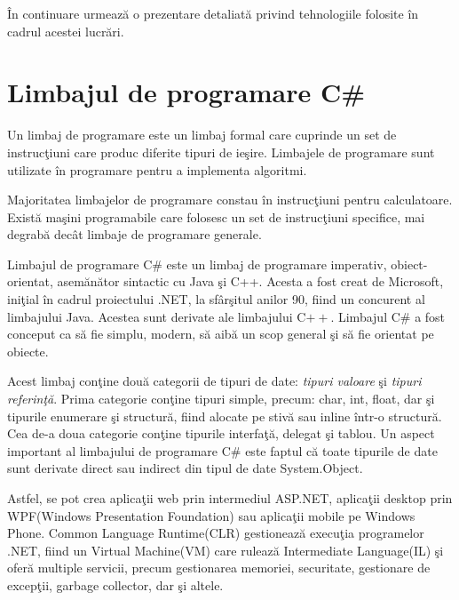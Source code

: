 \^{I}n continuare urmeaz\u{a} o prezentare detaliat\u{a} privind tehnologiile folosite \^{i}n cadrul acestei lucr\u{a}ri.

\section{Limbajul de programare C{\#}}

	Un limbaj de programare este un limbaj formal care cuprinde un set de instruc\c{t}iuni care produc diferite tipuri de ie\c{s}ire. Limbajele de programare sunt utilizate în programare pentru a implementa algoritmi.
	\bigskip
	
	Majoritatea limbajelor de programare constau \^{i}n instruc\c{t}iuni pentru calculatoare. Exist\u{a} ma\c{s}ini programabile care folosesc un set de instruc\c{t}iuni specifice, mai degrab\u{a} dec\^{a}t limbaje de programare generale.
	\bigskip
	
	Limbajul de programare C{\#} este un limbaj de programare imperativ, obiect-orientat, asem\u{a}n\u{a}tor sintactic cu Java \c{s}i C++. Acesta a fost creat de Microsoft, ini\c{t}ial \^{i}n cadrul proiectului .NET, la sf\^{a}r\c{s}itul anilor 90, fiind un concurent al limbajului Java. Acestea sunt derivate ale limbajului C$++$. Limbajul C{\#} a fost conceput ca s\u{a} fie simplu, modern,	s\u{a} aib\u{a} un scop general \c{s}i s\u{a} fie orientat pe obiecte.
	\bigskip
	
	Acest limbaj con\c{t}ine dou\u{a} categorii de tipuri de date: \textit{tipuri valoare} \c{s}i \textit{tipuri referin\c{t}\u{a}}. Prima categorie con\c{t}ine tipuri simple, precum: char, int, float, dar \c{s}i tipurile enumerare \c{s}i structur\u{a}, fiind alocate pe stiv\u{a} sau inline \^{i}ntr-o structur\u{a}. Cea de-a doua categorie con\c{t}ine tipurile interfa\c{t}\u{a}, delegat \c{s}i tablou. Un aspect important al limbajului de programare C{\#} este faptul c\u{a} toate tipurile de date sunt derivate direct sau indirect din tipul de date System.Object\cite{limbaj}.
	\bigskip
	
	Astfel, se pot crea aplica\c{t}ii web prin intermediul ASP.NET, aplica\c{t}ii desktop prin WPF(Windows Presentation Foundation) sau aplica\c{t}ii mobile pe Windows Phone. Common Language Runtime(CLR) gestioneaz\u{a} execu\c{t}ia programelor .NET, fiind un Virtual Machine(VM) care ruleaz\u{a} Intermediate Language(IL) \c{s}i ofer\u{a} multiple servicii, precum gestionarea memoriei, securitate, gestionare de excep\c{t}ii, garbage collector, dar \c{s}i altele. 
	\bigskip
	
